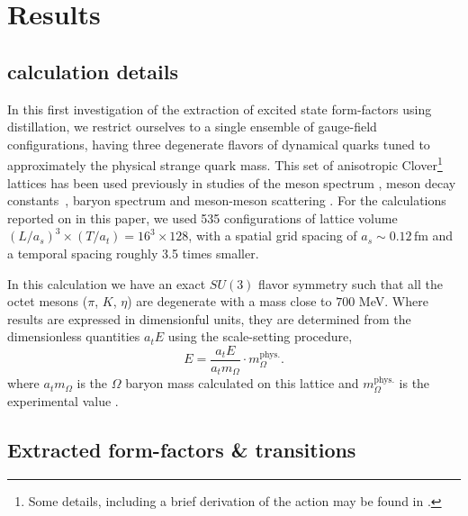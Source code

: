 \chapter{Results}

\section{calculation details} \label{sec::res::calc_det}

In this first investigation of the extraction of excited state form-factors using distillation, we restrict ourselves to a single ensemble of gauge-field configurations, having three degenerate flavors of dynamical quarks tuned to approximately the physical strange quark mass. This set of anisotropic Clover\footnote{Some details, including a brief derivation of the action may be found in .} lattices \cite{Edwards:2008ja, Lin:2008pr} has been used previously in studies of the meson spectrum \cite{Dudek:2009qf,Dudek:2010wm,Dudek:2011tt,Liu:2012ze,Dudek:2013yja}, meson decay constants~\cite{Mastropas:2014fsa}, baryon spectrum \cite{Edwards:2011jj, Dudek:2012ag, Edwards:2012fx, Padmanath:2013zfa} and meson-meson scattering \cite{Dudek:2010ew,Dudek:2012gj,Dudek:2012xn,Dudek:2014qha}. For the calculations reported on in this paper, we used 535 configurations of lattice volume $(L/a_s)^3 \times (T/a_t) = 16^3\times 128$, with a spatial grid spacing of $a_s \sim 0.12\, \mathrm{fm}$ and a temporal spacing roughly 3.5 times smaller. 

In this calculation we have an exact $SU(3)$ flavor symmetry such that all the octet mesons ($\pi$, $K$, $\eta$) are degenerate with a mass close to $700$ MeV. Where results are expressed in dimensionful units, they are determined from the dimensionless quantities $a_t E$ using the scale-setting procedure,
\begin{equation*}
E = \frac{a_t E}{a_t m_\Omega} \cdot m_\Omega^{\mathrm{phys.}}.
\end{equation*}
where $a_t m_\Omega$ is the $\Omega$ baryon mass calculated on this lattice and $m_\Omega^{\mathrm{phys.}}$ is the experimental value \cite{PDG-2012}.



\section{Extracted form-factors \& transitions\label{sec::results}}

